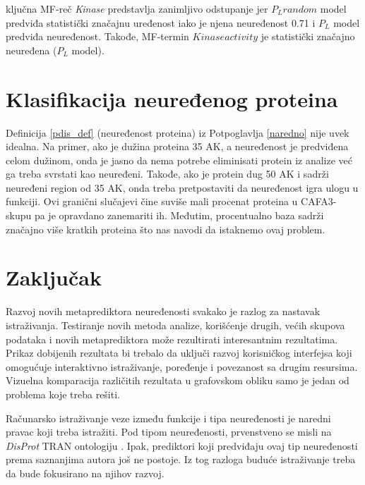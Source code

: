 ključna MF-reč  \textit{Kinase} predstavlja zanimljivo odstupanje jer $P_L
random$ model predviđa statistički značajnu uređenost iako je njena neuređenost 
0.71 i $P_L$ model predviđa neuređenost. Takođe, MF-termin $Kinase
activity$ je statistički značajno neuređena ($P_L$ model).

\section{Klasifikacija neuređenog proteina}

Definicija \ref{pdis_def} (neuređenost proteina) iz Potpoglavlja \ref{naredno}
nije uvek idealna.  Na primer, ako je dužina proteina 35 AK, a neuređenost je
predviđena celom dužinom, onda je jasno da nema potrebe eliminisati protein iz
analize već ga treba svrstati kao neuređeni.  Takođe, ako je protein dug 50 AK
i sadrži neuređeni region od 35 AK, onda treba pretpostaviti da neuređenost
igra ulogu u funkciji. Ovi granični slučajevi čine suviše mali procenat
proteina u CAFA3-skupu pa je opravdano zanemariti ih.  Međutim, procentualno
baza \swissprot sadrži značajno više kratkih proteina što nas navodi da
istaknemo ovaj problem.

\section{Zaključak}

Razvoj novih metaprediktora neuređenosti \cite{Meng_c2017} svakako je razlog za
nastavak istraživanja. Testiranje novih metoda analize, korišćenje drugih,
većih skupova podataka i novih metaprediktora može rezultirati interesantnim
rezultatima. Prikaz dobijenih rezultata bi trebalo da uključi razvoj
korisničkog interfejsa koji omogućuje interaktivno istraživanje, poređenje i
povezanost sa drugim resursima. Vizuelna komparacija različitih rezultata u
grafovskom obliku samo je jedan od problema koje treba rešiti.

Računarsko istraživanje veze između funkcije i tipa neuređenosti je naredni
pravac koji treba istražiti. Pod tipom neuređenosti, prvenstveno se misli na
\textit{DisProt} TRAN ontologiju \cite{Piovesan2016}. Ipak, prediktori koji predviđaju ovaj tip neuređenosti
prema saznanjima autora još ne postoje. Iz tog razloga buduće istraživanje
treba da bude fokusirano na njihov razvoj.

